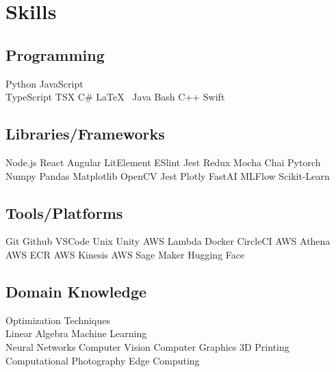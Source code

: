 \documentclass[]{plushcv}
\begin{document}
\begin{minipage}[t]{0.25\textwidth}


    \section{Skills}
    \subsection{Programming}
    \sectionsep
    Python \textbullet{} 
    JavaScript \textbullet{} \\ 
    TypeScript \textbullet{} 
    TSX \textbullet{} 
    C\# \textbullet{}
    \LaTeX\ \textbullet{}
    Java \textbullet{}  
    Bash \textbullet{}
    C++ \textbullet{} 
    Swift 
    \sectionsep{}
    \sectionsep{}
    \subsection{Libraries/Frameworks}
    \sectionsep{}
    Node.js \textbullet{}
    React \textbullet{}
    Angular \textbullet{}
    LitElement \textbullet{}
    ESlint \textbullet{} 
    Jest \textbullet{}
    Redux \textbullet{}
    Mocha \textbullet{} 
    Chai  \textbullet{} 
    Pytorch \textbullet{} 
    Numpy \textbullet{} 
    Pandas \textbullet{} 
    Matplotlib \textbullet{} 
    OpenCV \textbullet {} 
    Jest \textbullet{} 
    Plotly \textbullet{}
    FastAI \textbullet{}
    MLFlow \textbullet{}
    Scikit-Learn \textbullet{}
    \sectionsep{}
    \sectionsep{}
    \subsection{Tools/Platforms}
    \sectionsep{}
    Git \textbullet{} 
    Github \textbullet{}
    VSCode \textbullet{}  
    Unix \textbullet{}
    Unity \textbullet{} 
    AWS Lambda \textbullet{}
    Docker \textbullet{} 
    CircleCI \textbullet{} 
    AWS Athena \textbullet{}
    AWS ECR \textbullet{}
    AWS Kinesis \textbullet{}
    AWS Sage Maker \textbullet{}
    Hugging Face \textbullet{}
    \sectionsep{}
    \sectionsep{}
    \subsection{Domain Knowledge}
    \sectionsep
    Optimization Techniques \textbullet{} \\
    Linear Algebra \textbullet{}
    Machine Learning \textbullet{} \\ Neural Networks \textbullet{}
    Computer Vision \textbullet{} Computer Graphics \textbullet{} 3D Printing
    \textbullet{} Computational Photography \textbullet{} Edge Computing \textbullet{}
    \sectionsep


\end{minipage}
\end{document}
